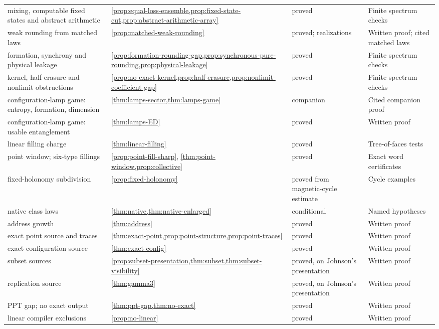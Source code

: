 \begin{longtable}{@{}L{0.3\textwidth}L{0.2\textwidth}L{0.18\textwidth}L{0.22\textwidth}@{}}
mixing, computable fixed states and abstract arithmetic & \cref{prop:equal-loss-ensemble,prop:fixed-state-cut,prop:abstract-arithmetic-array} & proved & Finite spectrum checks\\
weak rounding from matched laws & \cref{prop:matched-weak-rounding} & proved; realizations~\cite[Theorem~1.1 and Section~12]{DM-U3} & Written proof; cited matched laws\\
formation, synchrony and physical leakage & \cref{prop:formation-rounding-gap,prop:synchronous-pure-rounding,prop:physical-leakage} & proved & Finite spectrum checks\\
kernel, half-erasure and nonlimit obstructions & \cref{prop:no-exact-kernel,prop:half-erasure,prop:nonlimit-coefficient-gap} & proved & Finite spectrum checks\\
configuration-lamp game: entropy, formation, dimension & \cref{thm:lamps-sector,thm:lamps-game} & companion & Cited companion proof\\
configuration-lamp game: usable entanglement & \cref{thm:lamps-ED} & proved & Written proof\\
linear filling charge & \cref{thm:linear-filling} & proved & Tree-of-faces tests\\
point window; six-type fillings & \cref{prop:point-fill-sharp}, \cref{thm:point-window,prop:collective} & proved & Exact word certificates\\
fixed-holonomy subdivision & \cref{prop:fixed-holonomy} & proved from magnetic-cycle estimate & Cycle examples\\
native class laws & \cref{thm:native,thm:native-enlarged} & conditional & Named hypotheses\\
address growth & \cref{thm:address} & proved & Written proof\\
exact point source and traces & \cref{thm:exact-point,prop:point-structure,prop:point-traces} & proved & Written proof\\
exact configuration source & \cref{thm:exact-config} & proved & Written proof\\
subset sources & \cref{prop:subset-presentation,thm:subset,thm:subset-visibility} & proved, on Johnson's presentation & Written proof\\
replication source & \cref{thm:gamma3} & proved, on Johnson's presentation & Written proof\\
PPT gap; no exact output & \cref{thm:ppt-gap,thm:no-exact} & proved & Written proof\\
linear compiler exclusions & \cref{prop:no-linear} & proved & Written proof\\

\end{longtable}
